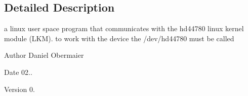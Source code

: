 \subsection{Detailed Description}
a linux user space program that communicates with the hd44780 linux kernel module (L\+K\+M). to work with the device the /dev/hd44780 must be called 

\begin{DoxyAuthor}{Author}
Daniel Obermaier 
\end{DoxyAuthor}
\begin{DoxyDate}{Date}
02.. 
\end{DoxyDate}
\begin{DoxyVersion}{Version}
0. 
\end{DoxyVersion}
